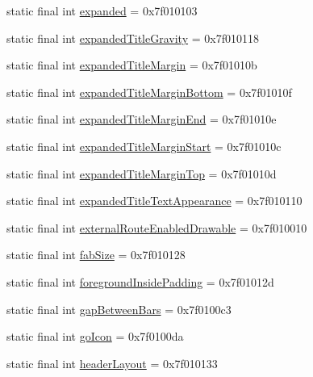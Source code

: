 \begin{CompactItemize}
static final int \hyperlink{classandroid_1_1support_1_1v7_1_1palette_1_1_r_1_1attr_f1194071a1a4bab1b5fc970394a7ac9a}{expanded} = 0x7f010103
\item 
static final int \hyperlink{classandroid_1_1support_1_1v7_1_1palette_1_1_r_1_1attr_5094a1a142140c090c9cf65b75c96fd1}{expandedTitleGravity} = 0x7f010118
\item 
static final int \hyperlink{classandroid_1_1support_1_1v7_1_1palette_1_1_r_1_1attr_aa09b1a509804b422a25e4f8bcd778b4}{expandedTitleMargin} = 0x7f01010b
\item 
static final int \hyperlink{classandroid_1_1support_1_1v7_1_1palette_1_1_r_1_1attr_c18308d0644ca1262a79d7835ce84bcf}{expandedTitleMarginBottom} = 0x7f01010f
\item 
static final int \hyperlink{classandroid_1_1support_1_1v7_1_1palette_1_1_r_1_1attr_f36a7a652ba8a476989cf3d7a9ca544c}{expandedTitleMarginEnd} = 0x7f01010e
\item 
static final int \hyperlink{classandroid_1_1support_1_1v7_1_1palette_1_1_r_1_1attr_41b9bb9b99a676048b9a8e3108c89bb5}{expandedTitleMarginStart} = 0x7f01010c
\item 
static final int \hyperlink{classandroid_1_1support_1_1v7_1_1palette_1_1_r_1_1attr_2803672178c4c302f5dfd2a684fdd88b}{expandedTitleMarginTop} = 0x7f01010d
\item 
static final int \hyperlink{classandroid_1_1support_1_1v7_1_1palette_1_1_r_1_1attr_c9c61a3fee1ac4992a3775b1f7cd5cb5}{expandedTitleTextAppearance} = 0x7f010110
\item 
static final int \hyperlink{classandroid_1_1support_1_1v7_1_1palette_1_1_r_1_1attr_bc434733783c2a7689b0167a34a2187b}{externalRouteEnabledDrawable} = 0x7f010010
\item 
static final int \hyperlink{classandroid_1_1support_1_1v7_1_1palette_1_1_r_1_1attr_da32a515fa0259a77929702bdf6993a7}{fabSize} = 0x7f010128
\item 
static final int \hyperlink{classandroid_1_1support_1_1v7_1_1palette_1_1_r_1_1attr_0d2b5b2bbfdf52e3bba66cb3814cce50}{foregroundInsidePadding} = 0x7f01012d
\item 
static final int \hyperlink{classandroid_1_1support_1_1v7_1_1palette_1_1_r_1_1attr_35cc0ed304ab03677caf6c8e384f2509}{gapBetweenBars} = 0x7f0100c3
\item 
static final int \hyperlink{classandroid_1_1support_1_1v7_1_1palette_1_1_r_1_1attr_5748c01c9363c4eb3ec66ecb62a418c0}{goIcon} = 0x7f0100da
\item 
static final int \hyperlink{classandroid_1_1support_1_1v7_1_1palette_1_1_r_1_1attr_e626a0140f01c07771b0d7b67c285de4}{headerLayout} = 0x7f010133

\end{CompactItemize}

